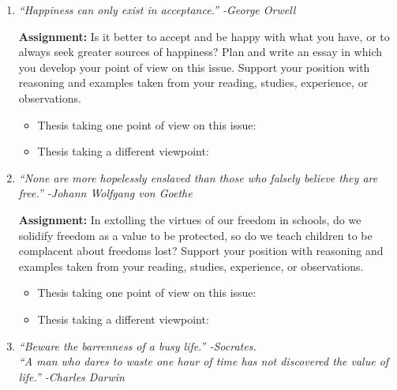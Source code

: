 \begin{enumerate}

\item \textit{``Happiness can only exist in acceptance.'' -George Orwell}

\textbf{Assignment:} Is it better to accept and be happy with what you have, or to always seek greater sources of happiness? Plan and write an essay in which you develop your point of view on this issue. Support your position with reasoning and examples taken from your reading, studies, experience, or observations.

\begin{spacing}{1.5}
\begin{itemize}
\item Thesis taking one point of view on this issue: \hrulefill

\hrulefill
\item Thesis taking a different viewpoint: \hrulefill

\hrulefill
\end{itemize}
\end{spacing}

\item \textit{``None are more hopelessly enslaved than those who falsely believe they are free.'' -Johann Wolfgang von Goethe}

\textbf{Assignment:} In extolling the virtues of our freedom in schools, do we solidify freedom as a value to be protected, so do we teach children to be complacent about freedoms lost? Support your position with reasoning and examples taken from your reading, studies, experience, or observations.

\begin{spacing}{1.5}
\begin{itemize}
\item Thesis taking one point of view on this issue: \hrulefill

\hrulefill

\item Thesis taking a different viewpoint: \hrulefill

\hrulefill
\end{itemize}
\end{spacing}

\item \textit{``Beware the barrenness of a busy life.'' -Socrates. \\ ``A man who dares to waste one hour of time has not discovered the value of life.'' -Charles Darwin}


\end{enumerate}
